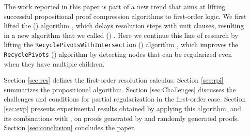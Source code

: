The work reported in this paper is part of a new trend that aims at lifting successful propositional proof compression algorithms to first-order logic. %
We first lifted the {\LowerUnits} ({\LU}) algorithm \cite{LURPI}, which delays resolution steps with unit clauses, resulting in a new algorithm that we called
{\SFOLowerUnits} 
({\GFOLU}) \cite{GFOLU}. Here we continue this line of research by lifting the 
\texttt{Recycle\-PivotsWithIntersection}
({\RPI}) algorithm \cite{LURPI}, which improves the \texttt{RecyclePivots} ({\RP}) algorithm \cite{RP08} by detecting nodes that can be regularized even when they have multiple children. 


Section \ref{sec:res} defines the first-order resolution calculus. Section \ref{sec:rpi} summarizes the propositional {\RPI} algorithm. 
Section \ref{sec:Challenges} discusses the challenges and conditions for partial regularization in the first-order case.
Section \ref{sec:exp} presents experimental results obtained by applying this algorithm, and its combinations with {\GFOLU}, on proofs generated by {\SPASS} \cite{Spass} and randomly generated proofs. Section \ref{sec:conclusion} concludes the paper.


